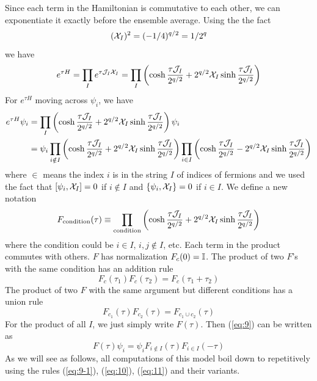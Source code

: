 \documentclass[11pt]{article}
\renewcommand{\>}{\rangle}
\newcommand{\<}{\langle}
\begin{document}
Since each term in the Hamiltonian is commutative to each other, we
can exponentiate it exactly before the ensemble average. Using the the
fact
\begin{equation}
(\mathcal{X}_{I})^{2}=(-1/4)^{q/2}=1/2^{q}\label{eq:5-1}
\end{equation}
we have
\begin{equation}
e^{\tau H}=\prod_{I}e^{\tau\mathcal{J}_{I}\mathcal{X}_{I}}=\prod_{I}\left(\cosh\frac{\tau\mathcal{J}_{I}}{2^{q/2}}+2^{q/2}\mathcal{X}_{I}\sinh\frac{\tau\mathcal{J}_{I}}{2^{q/2}}\right)\label{eq:8}
\end{equation}
For $e^{\tau H}$ moving across $\psi_{i}$, we have 
\begin{align}
e^{\tau H}\psi_{i} & =\prod_{I}\left(\cosh\frac{\tau\mathcal{J}_{I}}{2^{q/2}}+2^{q/2}\mathcal{X}_{I}\sinh\frac{\tau\mathcal{J}_{I}}{2^{q/2}}\right)\psi_{i}\nonumber \\
 & =\psi_{i}\prod_{i\notin I}\left(\cosh\frac{\tau\mathcal{J}_{I}}{2^{q/2}}+2^{q/2}\mathcal{X}_{I}\sinh\frac{\tau\mathcal{J}_{I}}{2^{q/2}}\right)\prod_{i\in I}\left(\cosh\frac{\tau\mathcal{J}_{I}}{2^{q/2}}-2^{q/2}\mathcal{X}_{I}\sinh\frac{\tau\mathcal{J}_{I}}{2^{q/2}}\right)\label{eq:9}
\end{align}
where $\in$ means the index $i$ is in the string $I$ of indices
of fermions and we used the fact that $[\psi_{i},\mathcal{X}_{I}]=0$ if $i\notin I$
and $\{\psi_{i},\mathcal{X}_{I}\}=0$ if $i\in I$. We define a new notation
\begin{equation}
F_{\text{condition}}(\tau)\equiv\prod_{\text{condition}}\left(\cosh\frac{\tau\mathcal{J}_{I}}{2^{q/2}}+2^{q/2}\mathcal{X}_{I}\sinh\frac{\tau\mathcal{J}_{I}}{2^{q/2}}\right)
\end{equation}
where the condition could be $i\in I$, $i,j\notin I$, etc. Each
term in the product commutes with others. $F$ has normalization $F_{c}(0)=\mathbb{I}$.
The product of two $F$'s with the same condition has an addition rule
\begin{equation}
F_{c}(\tau_{1})F_{c}(\tau_{2})=F_{c}(\tau_{1}+\tau_{2})\label{eq:9-1}
\end{equation}
The product of two $F$ with the same argument but different conditions
has a union rule
\begin{equation}
F_{c_{1}}(\tau)F_{c_{2}}(\tau)=F_{c_{1}\cup c_{2}}(\tau)\label{eq:10}
\end{equation}
For the product of all $I$, we just simply write $F(\tau)$. Then
(\ref{eq:9}) can be written as
\begin{equation}
F(\tau)\psi_{i}=\psi_{i}F_{i\notin I}(\tau)F_{i\in I}(-\tau)\label{eq:11}
\end{equation}
As we will see as follows, all computations of this model boil down
to repetitively using the rules (\ref{eq:9-1}), (\ref{eq:10}), (\ref{eq:11})
and their variants.
\end{document}
